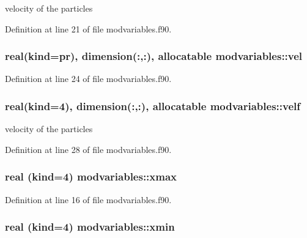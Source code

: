 velocity of the particles 



Definition at line 21 of file modvariables.\-f90.

\hypertarget{classmodvariables_aea9c591211b0b8c19d6ab8d5b017c789}{
\subsubsection[{vel}]{\setlength{\rightskip}{0pt plus 5cm}real(kind=pr), dimension(\-:,\-:), allocatable modvariables\-::vel}}\label{classmodvariables_aea9c591211b0b8c19d6ab8d5b017c789}


Definition at line 24 of file modvariables.\-f90.

\hypertarget{classmodvariables_a99c2bd91d22daa7bfaa3491624db7f14}{
\subsubsection[{velf}]{\setlength{\rightskip}{0pt plus 5cm}real(kind=4), dimension(\-:,\-:), allocatable modvariables\-::velf}}\label{classmodvariables_a99c2bd91d22daa7bfaa3491624db7f14}


velocity of the particles 



Definition at line 28 of file modvariables.\-f90.

\hypertarget{classmodvariables_a9112a5edebd73d310c4594fca429a757}{
\subsubsection[{xmax}]{\setlength{\rightskip}{0pt plus 5cm}real (kind=4) modvariables\-::xmax}}\label{classmodvariables_a9112a5edebd73d310c4594fca429a757}


Definition at line 16 of file modvariables.\-f90.

\hypertarget{classmodvariables_aaa639d561a94ae000546755b6863b6be}{
\subsubsection[{xmin}]{\setlength{\rightskip}{0pt plus 5cm}real (kind=4) modvariables\-::xmin}}\label{classmodvariables_aaa639d561a94ae000546755b6863b6be}



